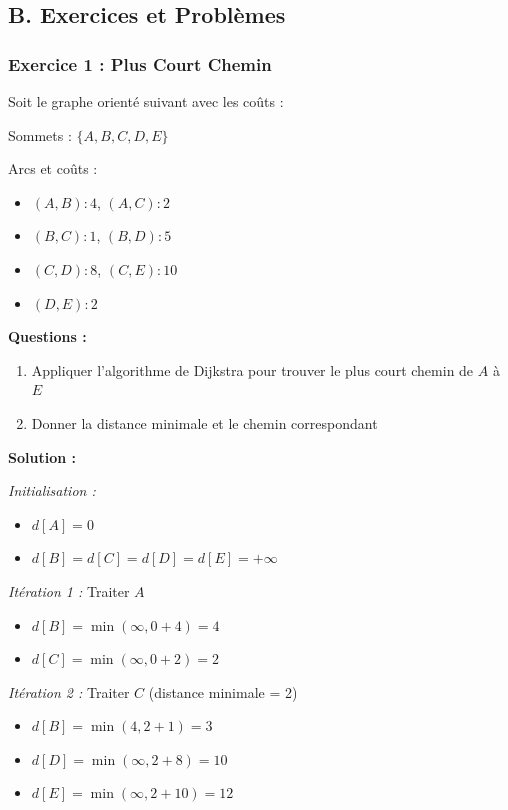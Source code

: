 \documentclass[12pt,a4paper]{article}
\begin{document}
\newpage
\subsection*{B. Exercices et Problèmes}

\subsubsection*{Exercice 1 : Plus Court Chemin}

\begin{exemple}
Soit le graphe orienté suivant avec les coûts :

Sommets : $\{A, B, C, D, E\}$

Arcs et coûts :
\begin{itemize}
    \item $(A,B): 4$, $(A,C): 2$
    \item $(B,C): 1$, $(B,D): 5$
    \item $(C,D): 8$, $(C,E): 10$
    \item $(D,E): 2$
\end{itemize}

\textbf{Questions :}
\begin{enumerate}
    \item Appliquer l'algorithme de Dijkstra pour trouver le plus court chemin de $A$ à $E$
    \item Donner la distance minimale et le chemin correspondant
\end{enumerate}

\textbf{Solution :}

\textit{Initialisation :}
\begin{itemize}
    \item $d[A] = 0$
    \item $d[B] = d[C] = d[D] = d[E] = +\infty$
\end{itemize}

\textit{Itération 1 :} Traiter $A$
\begin{itemize}
    \item $d[B] = \min(\infty, 0 + 4) = 4$
    \item $d[C] = \min(\infty, 0 + 2) = 2$
\end{itemize}

\textit{Itération 2 :} Traiter $C$ (distance minimale = 2)
\begin{itemize}
    \item $d[B] = \min(4, 2 + 1) = 3$
    \item $d[D] = \min(\infty, 2 + 8) = 10$
    \item $d[E] = \min(\infty, 2 + 10) = 12$
\end{itemize}


\end{exemple}
\end{document}
